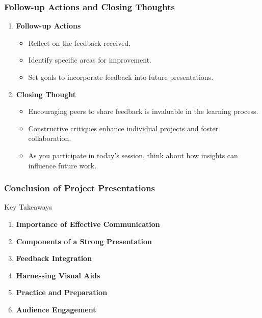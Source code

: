\documentclass[aspectratio=169]{beamer}
\begin{document}
\begin{frame}[fragile]
    \frametitle{Follow-up Actions and Closing Thoughts}
    \begin{enumerate}
        \item \textbf{Follow-up Actions}
        \begin{itemize}
            \item Reflect on the feedback received.
            \item Identify specific areas for improvement.
            \item Set goals to incorporate feedback into future presentations.
        \end{itemize}
        
        \item \textbf{Closing Thought}
        \begin{itemize}
            \item Encouraging peers to share feedback is invaluable in the learning process.
            \item Constructive critiques enhance individual projects and foster collaboration.
            \item As you participate in today's session, think about how insights can influence future work.
        \end{itemize}
    \end{enumerate}
\end{frame}

\begin{frame}[fragile]
    \frametitle{Conclusion of Project Presentations}
    \begin{block}{Key Takeaways}
        \begin{enumerate}
            \item \textbf{Importance of Effective Communication}
            \item \textbf{Components of a Strong Presentation}
            \item \textbf{Feedback Integration}
            \item \textbf{Harnessing Visual Aids}
            \item \textbf{Practice and Preparation}
            \item \textbf{Audience Engagement}
        \end{enumerate}
    \end{block}
\end{frame}
\end{document}
